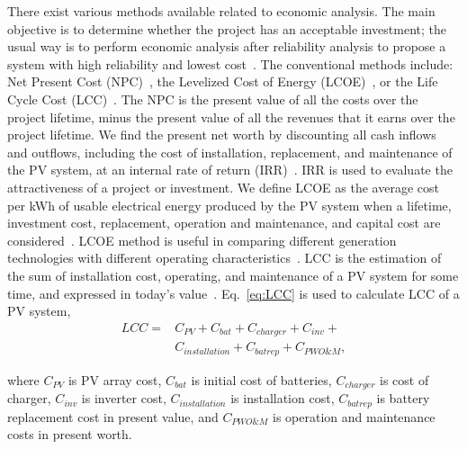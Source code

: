 \documentclass[journal]{IEEEtran}
\begin{document}
There exist various methods available related to economic analysis. The main objective is to determine whether the project has an acceptable investment; the usual way is to perform economic analysis after reliability analysis to propose a system with high reliability and lowest cost~\cite{Alsadi2018}. The conventional methods include: Net Present Cost (NPC)~\cite{Park2004}, the Levelized Cost of Energy (LCOE)~\cite{Zhou2010}, or the Life Cycle Cost (LCC)~\cite{Applasamy2011}. The NPC is the present value of all the costs over the project lifetime, minus the present value of all the revenues that it earns over the project lifetime. We find the present net worth by discounting all cash inflows and outflows, including the cost of installation, replacement, and maintenance of the PV system, at an internal rate of return (IRR)~\cite{Park2004}. IRR is used to evaluate the attractiveness of a project or investment. We define LCOE as the average cost per kWh of usable electrical energy produced by the PV system when a lifetime, investment cost, replacement, operation and maintenance, and capital cost are considered~\cite{Kamel2005}. LCOE method is useful in comparing different generation technologies with different operating characteristics~\cite{Zhou2010}. LCC is the estimation of the sum of installation cost, operating, and maintenance of a PV system for some time, and expressed in today's value~\cite{Applasamy2011}. Eq.~\eqref{eq:LCC} is used to calculate LCC of a PV system,
%
\begin{equation}
\label{eq:LCC}
\begin{aligned}
LCC = & C_{PV} + C_{bat} + C_{charger} + C_{inv} + \\
   & C_{installation} + C_{batrep} + C_{PWO\&M},
\end{aligned}
\end{equation}

\noindent where $C_{PV}$ is PV array cost, $C_{bat}$ is initial cost of batteries, $C_{charger}$ is cost of charger, $C_{inv}$ is inverter cost, $C_{installation}$ is installation cost, $C_{batrep}$ is battery replacement cost in present value, and $C_{PWO\&M}$ is operation and maintenance costs in present worth.
\end{document}
